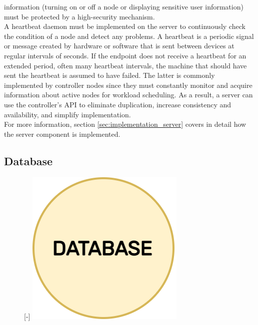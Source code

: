 information (turning on or off a node or displaying sensitive user information)
must be protected by a high-security mechanism. \\ %
A heartbeat daemon must be implemented on the server to continuously check the
condition of a node and detect any problems. A heartbeat is a periodic signal or
message created by hardware or software that is sent between devices at regular intervals
of seconds. If the endpoint does not receive a heartbeat for an extended period,
often many heartbeat intervals, the machine that should have sent the heartbeat
is assumed to have failed\cite{heartbeat}. The latter is commonly implemented by
controller nodes since they must constantly monitor and acquire information
about active nodes for workload scheduling. As a result, a server can use the
controller's API to eliminate duplication, increase consistency and availability,
and simplify implementation. \\ %
For more information, section \ref{sec:implementation_server} covers in detail how
the server component is implemented.

\subsection{Database}
\label{subsec:architecture_components_database}

\begin{figure} %
  \raisebox{0pt}[\dimexpr\height-\baselineskip\relax]{\centering
  \includegraphics[width=.2\textwidth]{images/recluster/database.png}}
\end{figure}

